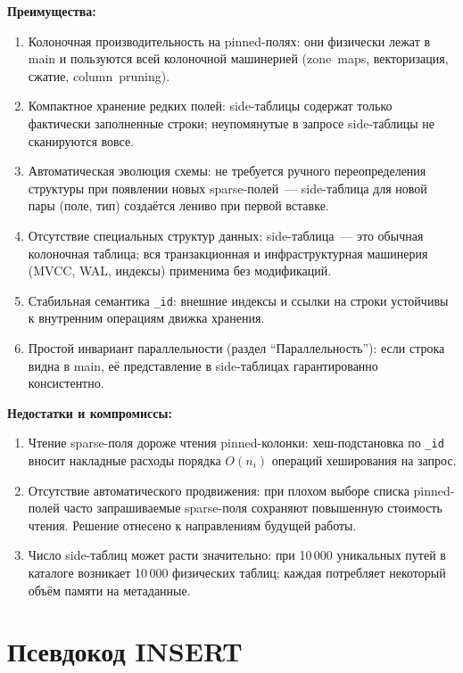 \textbf{Преимущества:}
\begin{enumerate}
    \item Колоночная производительность на pinned-полях: они
    физически лежат в main и пользуются всей колоночной
    машинерией (zone~maps, векторизация, сжатие, column~pruning).
    \item Компактное хранение редких полей: side-таблицы содержат
    только фактически заполненные строки; неупомянутые в запросе
    side-таблицы не сканируются вовсе.
    \item Автоматическая эволюция схемы: не требуется ручного
    переопределения структуры при появлении новых sparse-полей~---
    side-таблица для новой пары (поле, тип) создаётся лениво при
    первой вставке.
    \item Отсутствие специальных структур данных: side-таблица~---
    это обычная колоночная таблица; вся транзакционная и
    инфраструктурная машинерия (MVCC, WAL, индексы) применима
    без модификаций.
    \item Стабильная семантика \texttt{\_id}: внешние индексы и
    ссылки на строки устойчивы к внутренним операциям движка
    хранения.
    \item Простой инвариант параллельности (раздел
    ``Параллельность''): если строка видна в main, её
    представление в side-таблицах гарантированно консистентно.
\end{enumerate}

\textbf{Недостатки и компромиссы:}
\begin{enumerate}
    \item Чтение sparse-поля дороже чтения pinned-колонки:
    хеш-подстановка по \texttt{\_id} вносит накладные расходы
    порядка $O(n_i)$ операций хеширования на запрос.
    \item Отсутствие автоматического продвижения: при плохом
    выборе списка pinned-полей часто запрашиваемые
    sparse-поля сохраняют повышенную стоимость чтения. Решение
    отнесено к направлениям будущей работы.
    \item Число side-таблиц может расти значительно: при
    10\,000 уникальных путей в каталоге возникает 10\,000
    физических таблиц; каждая потребляет некоторый объём
    памяти на метаданные.
\end{enumerate}

\section{Псевдокод INSERT}


